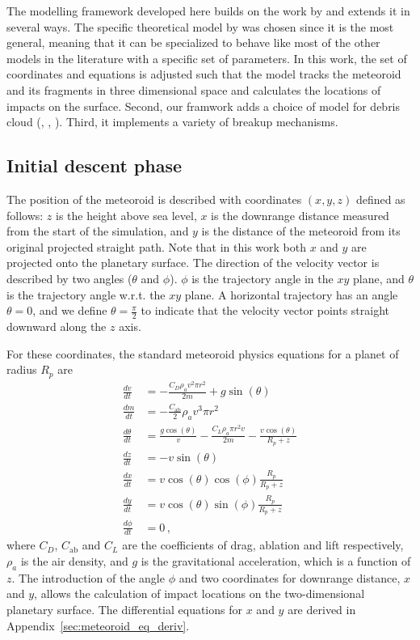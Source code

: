 The modelling framework developed here builds on the work by \cite{wheeler2017fragmentcloud,wheeler2018atmospheric} and extends it in several ways. The specific theoretical model by \cite{wheeler2017fragmentcloud} was chosen since it is the most general, meaning that it can be specialized to behave like most of the other models in the literature with a specific set of parameters.
In this work, the set of coordinates and equations is adjusted such that the model tracks the meteoroid and its fragments in three dimensional space and calculates the locations of impacts on the surface.
Second, our framwork adds a choice of model for debris cloud (\cite{hills1993fragmentation}, \cite{avramenko2014simulation}, \cite{chyba1993tunguska}).
Third, it implements a variety of breakup mechanisms.

\subsection{Initial descent phase}

The position of the meteoroid is described with coordinates $(x, y, z)$ defined as follows: $z$ is the height above sea level, $x$ is the downrange distance measured from the start of the simulation, and $y$ is the distance of the meteoroid from its original projected straight path. Note that in this work both $x$ and $y$ are projected onto the planetary surface. The direction of the velocity vector is described by two angles ($\theta$ and $\phi$). $\phi$ is the trajectory angle in the $xy$ plane, and $\theta$ is the trajectory angle w.r.t. the $xy$ plane. A horizontal trajectory has an angle $\theta = 0$, and we define $\theta = \frac{\pi}{2}$ to indicate that the velocity vector points straight downward along the $z$ axis.

For these coordinates, the standard meteoroid physics equations \citep[e.g.][]{passey1980effects} for a planet of radius $R_p$ are
\begin{align}
    \label{eq:dvdt} \frac{dv}{dt} &= -\frac{C_D \rho_a v^2 \pi r^2}{2m} + g\sin(\theta) \\
    \frac{dm}{dt} &= -\frac{C_\mathrm{ab}}{2}\rho_a v^3 \pi r^2 \\
    \frac{d\theta}{dt} &= \frac{g\cos(\theta)}{v} - \frac{C_L \rho_a \pi r^2 v}{2m} - \frac{v\cos(\theta)}{R_p + z} \\
    \frac{dz}{dt} &= -v\sin(\theta) \\
    \frac{dx}{dt} &= v\cos(\theta)\cos(\phi)\frac{R_p}{R_p + z} \\
    \label{eq:dydt} \frac{dy}{dt} &= v\cos(\theta)\sin(\phi)\frac{R_p}{R_p + z} \\
    \frac{d\phi}{dt} &= 0\,,
\end{align}
where $C_D$, $C_\mathrm{ab}$ and $C_L$ are the coefficients of drag, ablation and lift respectively, $\rho_a$ is the air density, and $g$ is the gravitational acceleration, which is a function of $z$. The introduction of the angle $\phi$ and two coordinates for downrange distance, $x$ and $y$, allows the calculation of impact locations on the two-dimensional planetary surface. The differential equations for $x$ and $y$ are derived in Appendix~\ref{sec:meteoroid_eq_deriv}.


